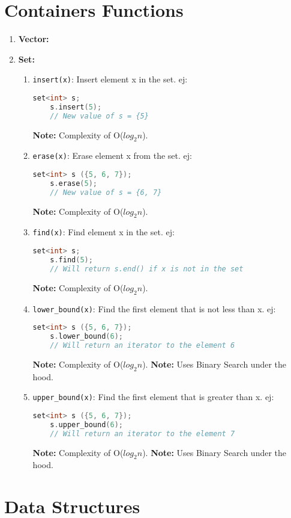 \documentclass{article}
\begin{document}
\section*{Containers Functions}
\begin{enumerate}
  \item \textbf{Vector:}
  \item \textbf{Set:}
    \begin{enumerate}
      \item \texttt{insert(x)}: Insert element x in the set. ej: 
	\begin{lstlisting}[language=C++]
	set<int> s;
	s.insert(5);
	// New value of s = {5}
	\end{lstlisting}
	\textbf{Note:} Complexity of O($log_2n$).
      \item \texttt{erase(x)}: Erase element x from the set. ej: 
	\begin{lstlisting}[language=C++]
	set<int> s ({5, 6, 7});
	s.erase(5);
	// New value of s = {6, 7}
	\end{lstlisting}
	\textbf{Note:} Complexity of O($log_2n$).
      \item \texttt{find(x)}: Find element x in the set. ej: 
	\begin{lstlisting}[language=C++]
	set<int> s; 
	s.find(5);
	// Will return s.end() if x is not in the set
	\end{lstlisting}
	\textbf{Note:} Complexity of O($log_2n$).
      \item \texttt{lower\_bound(x)}: Find the first element that is not less than x. ej:
	\begin{lstlisting}[language=C++]
	set<int> s ({5, 6, 7});
	s.lower_bound(6);
	// Will return an iterator to the element 6
	\end{lstlisting}
	\textbf{Note:} Complexity of O($log_2n$).
	\textbf{Note:} Uses Binary Search under the hood.
      \item \texttt{upper\_bound(x)}: Find the first element that is greater than x. ej:
	\begin{lstlisting}[language=C++]
	set<int> s ({5, 6, 7});
	s.upper_bound(6);
	// Will return an iterator to the element 7
	\end{lstlisting}
	\textbf{Note:} Complexity of O($log_2n$).
	\textbf{Note:} Uses Binary Search under the hood.
    \end{enumerate}
\end{enumerate}
\section{Data Structures}
\end{document}
